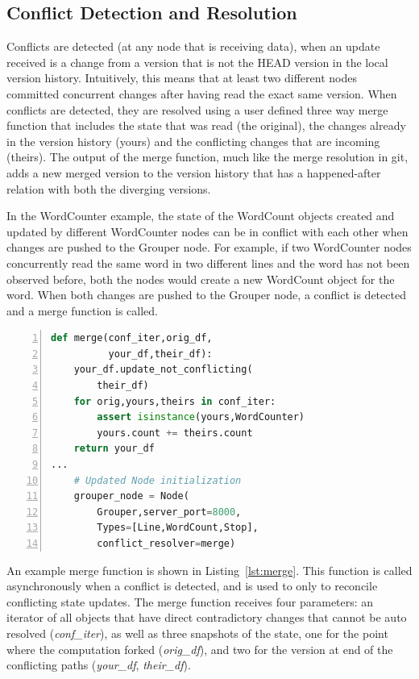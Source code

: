 \subsection{Conflict Detection and Resolution}
Conflicts are detected (at any node that is receiving data), when an update received is a change from a version that is not the HEAD version in the local version history. Intuitively, this means that at least two different nodes committed concurrent changes after having read the exact same version. When conflicts are detected, they are resolved using a user defined three way merge function that includes the state that was read (the original), the changes already in the version history (yours) and the conflicting changes that are incoming (theirs). The output of the merge function, much like the merge resolution in git, adds a new merged version to the version history that has a happened-after relation with both the diverging versions. 

In the WordCounter example, the state of the WordCount objects created and updated by different WordCounter nodes can be in conflict with each other when changes are pushed to the Grouper node. For example, if two WordCounter nodes concurrently read the same word in two different lines and the word has not been observed before, both the nodes would create a new WordCount object for the word. When both changes are pushed to the Grouper node, a conflict is detected and a merge function is called.

\begin{lstlisting}[language=Python,basicstyle=\small, numbers=left, 
label=lst:merge, captionpos=b, caption=Merge function used at the Grouper node.]
def merge(conf_iter,orig_df,
          your_df,their_df):
    your_df.update_not_conflicting(
        their_df)
    for orig,yours,theirs in conf_iter:
        assert isinstance(yours,WordCounter)
        yours.count += theirs.count
    return your_df
...
    # Updated Node initialization
    grouper_node = Node(
        Grouper,server_port=8000,
        Types=[Line,WordCount,Stop],
        conflict_resolver=merge)
\end{lstlisting}


An example merge function is shown in Listing~\ref{lst:merge}. This function is called asynchronously when a conflict is detected, and is used to only to reconcile conflicting state updates. The merge function receives four parameters: an iterator of all objects that have direct contradictory changes that cannot be auto resolved ({\em conf\_iter}), as well as three snapshots of the state, one for the point where the computation forked ({\em orig\_df}), and two for the version at end of the conflicting paths ({\em your\_df}, {\em their\_df}). 

